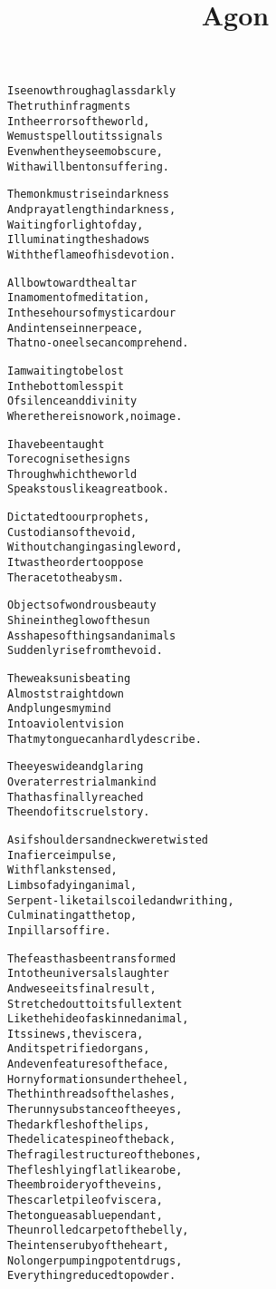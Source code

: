 \documentclass{article}
\title{Agon}
\begin{document}
\maketitle

\clearpage

\begin{alltt}\normalfont
I see now through a glass darkly
The truth in fragments
In the errors of the world,
We must spell out its signals
Even when they seem obscure,
With a will bent on suffering.

The monk must rise in darkness
And pray at length in darkness,
Waiting for light of day,
Illuminating the shadows
With the flame of his devotion.

All bow toward the altar
In a moment of meditation,
In these hours of mystic ardour
And intense inner peace,
That no-one else can comprehend.

I am waiting to be lost
In the bottomless pit
Of silence and divinity
Where there is no work, no image.

I have been taught
To recognise the signs
Through which the world
Speaks to us like a great book.

Dictated to our prophets,
Custodians of the void,
Without changing a single word,
It was the order to oppose
The race to the abysm.

Objects of wondrous beauty
Shine in the glow of the sun
As shapes of things and animals
Suddenly rise from the void.

The weak sun is beating
Almost straight down
And plunges my mind
Into a violent vision
That my tongue can hardly describe.

The eyes wide and glaring
Over a terrestrial mankind
That has finally reached
The end of its cruel story.

As if shoulders and neck were twisted
In a fierce impulse,
With flanks tensed,
Limbs of a dying animal,
Serpent-like tails coiled and writhing,
Culminating at the top,
In pillars of fire.

The feast has been transformed
Into the universal slaughter
And we see its final result,
Stretched out to its full extent
Like the hide of a skinned animal,
Its sinews, the viscera,
And its petrified organs,
And even features of the face,
Horny formations under the heel,
The thin threads of the lashes,
The runny substance of the eyes,
The dark flesh of the lips,
The delicate spine of the back,
The fragile structure of the bones,
The flesh lying flat like a robe,
The embroidery of the veins,
The scarlet pile of viscera,
The tongue as a blue pendant,
The unrolled carpet of the belly,
The intense ruby of the heart,
No longer pumping potent drugs,
Everything reduced to powder.


\end{alltt}
\end{document}
